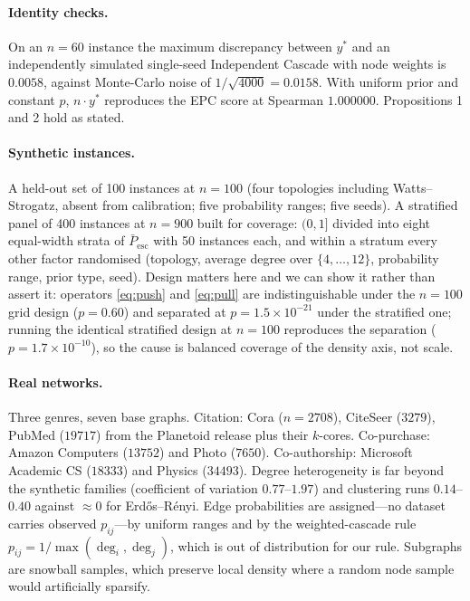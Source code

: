 \documentclass[11pt,a4paper]{article}
\newcommand{\Pescbar}{\bar{P}_{\mathrm{esc}}}
\begin{document}
\paragraph{Identity checks.} On an $n=60$ instance the maximum discrepancy
between $y^*$ and an independently simulated single-seed Independent Cascade
with node weights is $0.0058$, against Monte-Carlo noise of $1/\sqrt{4000}=
0.0158$. With uniform prior and constant $p$, $n\cdot y^*$ reproduces the EPC
score at Spearman $1.000000$. Propositions 1 and 2 hold as stated.

\paragraph{Synthetic instances.} A held-out set of 100 instances at $n=100$
(four topologies including Watts--Strogatz, absent from calibration; five
probability ranges; five seeds). A stratified panel of 400 instances at $n=900$
built for coverage: $(0,1]$ divided into eight equal-width strata of $\Pescbar$
with 50 instances each, and within a stratum every other factor randomised
(topology, average degree over $\{4,\dots,12\}$, probability range, prior type,
seed). Design matters here and we can show it rather than assert it: operators
\eqref{eq:push} and \eqref{eq:pull} are indistinguishable under the $n=100$ grid
design ($p=0.60$) and separated at $p=1.5\times10^{-21}$ under the stratified
one; running the identical stratified design at $n=100$ reproduces the
separation ($p=1.7\times10^{-10}$), so the cause is balanced coverage of the
density axis, not scale.

\paragraph{Real networks.} Three genres, seven base graphs. Citation: Cora
($n=2708$), CiteSeer ($3279$), PubMed ($19717$) from the Planetoid release plus
their $k$-cores. Co-purchase: Amazon Computers ($13752$) and Photo ($7650$).
Co-authorship: Microsoft Academic CS ($18333$) and Physics ($34493$). Degree
heterogeneity is far beyond the synthetic families (coefficient of variation
$0.77$--$1.97$) and clustering runs $0.14$--$0.40$ against $\approx0$ for
Erdős--Rényi. Edge probabilities are assigned---no dataset carries observed
$p_{ij}$---by uniform ranges and by the weighted-cascade rule
$p_{ij}=1/\max(\deg_i,\deg_j)$, which is out of distribution for our rule.
Subgraphs are snowball samples, which preserve local density where a random node
sample would artificially sparsify.
\end{document}

